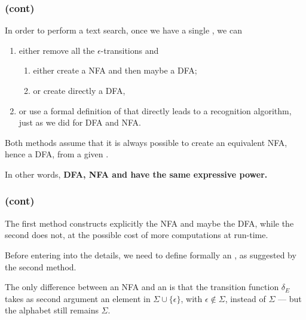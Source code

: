 % 
\begin{frame}
\frametitle{\eNFA (cont)}

In order to perform a text search, once we have a single \eNFA, we can
\begin{enumerate}

  \item either remove all the \(\epsilon\)-transitions and 
  \begin{enumerate}
    \item either create a NFA and then maybe a DFA;

    \item or create directly a DFA,

  \end{enumerate}

  \item or use a formal definition of \eNFA that directly leads to a
  recognition algorithm, just as we did for DFA and NFA.

\end{enumerate}
Both methods assume that it is always possible to create an equivalent
NFA, hence a DFA, from a given \eNFA. 

\bigskip

In other words, \textbf{DFA, NFA and \eNFA have the same expressive
  power.}

\end{frame}

% 
\begin{frame}
\frametitle{\eNFA (cont)}

The first method constructs explicitly the NFA and maybe the DFA,
while the second does not, at the possible cost of more computations
at run-time.

\bigskip

Before entering into the details, we need to define formally an
\eNFA, as suggested by the second method.

\bigskip

The only difference between an NFA and an \eNFA is that the
transition function \(\delta_E\) takes as second argument an element
in \(\Sigma \cup \{\epsilon\}\), with \(\epsilon \not\in \Sigma\),
instead of \(\Sigma\) --- but the alphabet still remains \(\Sigma\).

\end{frame}

